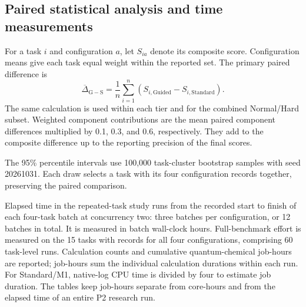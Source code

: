 \subsection{Paired statistical analysis and time measurements}
For a task $i$ and configuration $a$, let $S_{ia}$ denote its composite score. Configuration means give each task equal weight within the reported set. The primary paired difference is
\begin{equation}
\overline{\Delta}_{\mathrm{G-S}}=\frac{1}{n}\sum_{i=1}^{n}
\left(S_{i,\mathrm{Guided}}-S_{i,\mathrm{Standard}}\right).
\label{eq:si-paired-difference}
\end{equation}
The same calculation is used within each tier and for the combined Normal/Hard subset. Weighted component contributions are the mean paired component differences multiplied by 0.1, 0.3, and 0.6, respectively. They add to the composite difference up to the reporting precision of the final scores.

The 95\% percentile intervals use 100,000 task-cluster bootstrap samples with seed 20261031. Each draw selects a task with its four configuration records together, preserving the paired comparison.

Elapsed time in the repeated-task study runs from the recorded start to finish of each four-task batch at concurrency two: three batches per configuration, or 12 batches in total. It is measured in batch wall-clock hours. Full-benchmark effort is measured on the 15 tasks with records for all four configurations, comprising 60 task-level runs. Calculation counts and cumulative quantum-chemical job-hours are reported; job-hours sum the individual calculation durations within each run. For Standard/M1, native-log CPU time is divided by four to estimate job duration. The tables keep job-hours separate from core-hours and from the elapsed time of an entire P2 research run.
